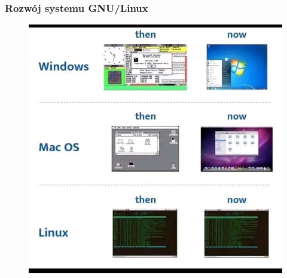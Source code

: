 \documentclass[10pt,t]{beamer}
\begin{document}
\begin{frame}
  \frametitle{Rozwój systemu GNU/Linux}

  \vspace{-0.5em}


  \begin{figure}

    \label{fig:Evolution-of-OS}

    \centering


    \includegraphics[scale=0.3]
    {./Presentations-pictures/Miscancellous-pictures/Evolution-of-operating-systems.jpg}

  \end{figure}

\end{frame}
\end{document}
